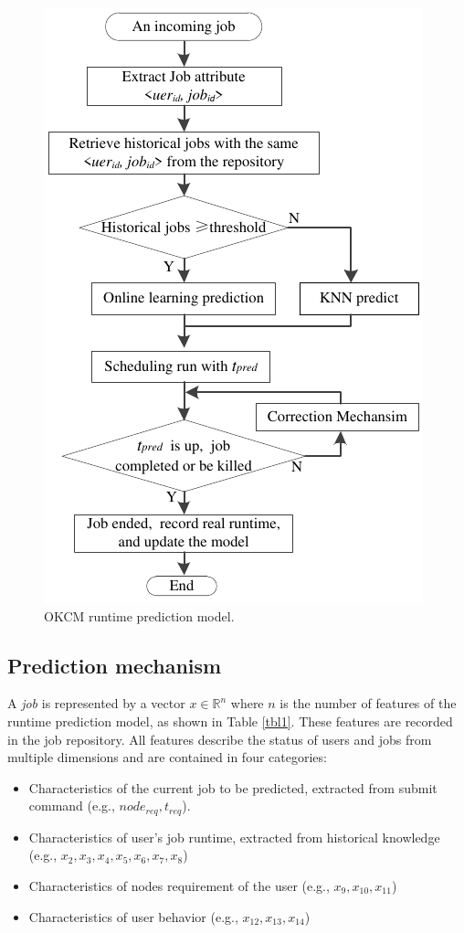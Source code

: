 \documentclass[a4paper,fleqn]{cas-sc}
\begin{document}
\begin{figure}
	\centering
	\includegraphics[scale=.75]{figs/Fig2.pdf}
	\caption{OKCM runtime prediction model.}
	\label{FIG:2}
\end{figure}

\subsection{Prediction mechanism}
A \textit{job} is represented by a vector $x \in \mathbb{R}^{n} $ where $n$ is the number of features of the runtime prediction model, as shown in Table \ref{tbl1}. These features are recorded in the job repository. All features describe the status of users and jobs from multiple dimensions and are contained in four categories:
\begin{itemize} 
	\item Characteristics of the current job to be predicted, extracted from submit command (e.g., $node_{req}, t_{req}$). 
	\item Characteristics of user's job runtime, extracted from historical knowledge (e.g., $x_2, x_3, x_4, x_5, x_6, x_7, x_8$) 
	\item Characteristics of nodes requirement of the user (e.g., $x_9, x_{10}, x_{11}$)
	\item Characteristics of user behavior (e.g., $x_{12}, x_{13}, x_{14}$)
\end{itemize}
\end{document}
